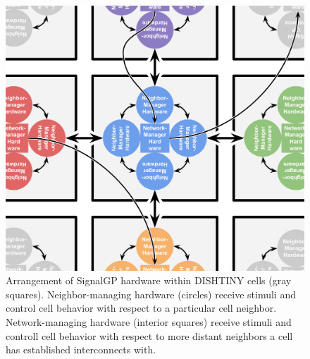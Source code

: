 \begin{figure}[t]
\begin{center}
\includegraphics[width=0.8\linewidth]{img/spiker-pointer-hardware2.pdf}
\caption{
Arrangement of SignalGP hardware within DISHTINY cells (gray squares).
Neighbor-managing hardware (circles) receive stimuli and control cell behavior with respect to a particular cell neighbor.
Network-managing hardware (interior squares) receive stimuli and controll cell behavior with respect to more distant neighbors a cell has established interconnects with.
}
\label{fig:spiker_pointer_hardware}
\end{center}
\end{figure}
